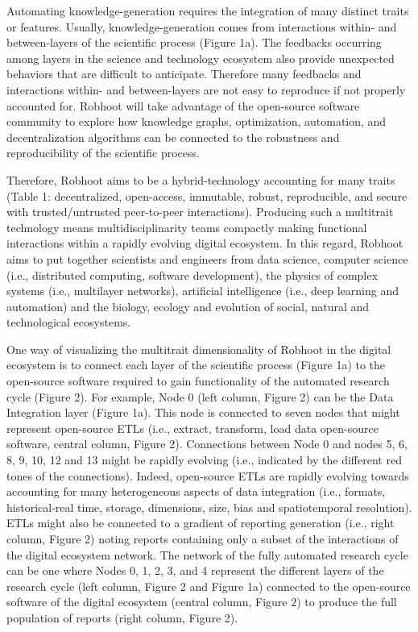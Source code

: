 \documentclass[10pt, a4paper, twocolumn]{article} %
\begin{document}
{  Automating knowledge-generation requires the integration of many
  distinct traits or features. Usually, knowledge-generation comes
  from interactions within- and between-layers of the scientific
  process (Figure 1a). The feedbacks occurring among layers in the
  science and technology ecosystem also provide unexpected behaviors
  that are difficult to anticipate. Therefore many feedbacks and
  interactions within- and between-layers are not easy to reproduce if
  not properly accounted for. Robhoot will take advantage of the
  open-source software community to explore how knowledge graphs,
  optimization, automation, and decentralization algorithms can be
  connected to the robustness and reproducibility of the scientific
  process.

  Therefore, Robhoot aims to be a hybrid-technology accounting for
  many traits (Table 1: decentralized, open-access, immutable, robust,
  reproducible, and secure with trusted/untrusted peer-to-peer
  interactions). Producing such a multitrait technology means
  multidisciplinarity teams compactly making functional interactions
  within a rapidly evolving digital ecosystem. In this regard, Robhoot
  aims to put together scientists and engineers from data science,
  computer science (i.e., distributed computing, software
  development), the physics of complex systems (i.e., multilayer
  networks), artificial intelligence (i.e., deep learning and
  automation) and the biology, ecology and evolution of social,
  natural and technological ecosystems.

  One way of visualizing the multitrait dimensionality of Robhoot in
  the digital ecosystem is to connect each layer of the scientific
  process (Figure 1a) to the open-source software required to gain
  functionality of the automated research cycle (Figure 2). For
  example, Node 0 (left column, Figure 2) can be the Data Integration
  layer (Figure 1a). This node is connected to seven nodes that might
  represent open-source ETLs (i.e., extract, transform, load data
  open-source software, central column, Figure 2). Connections between
  Node 0 and nodes 5, 6, 8, 9, 10, 12 and 13 might be rapidly evolving
  (i.e., indicated by the different red tones of the
  connections). Indeed, open-source ETLs are rapidly evolving towards
  accounting for many heterogeneous aspects of data integration (i.e.,
  formats, historical-real time, storage, dimensions, size, bias and
  spatiotemporal resolution). ETLs might also be connected to a
  gradient of reporting generation (i.e., right column, Figure 2)
  noting reports containing only a subset of the interactions of the
  digital ecosystem network. The network of the fully automated
  research cycle can be one where Nodes 0, 1, 2, 3, and 4 represent
  the different layers of the research cycle (left column, Figure 2
  and Figure 1a) connected to the open-source software of the digital
  ecosystem (central column, Figure 2) to produce the full population
  of reports (right column, Figure 2).


}
\end{document}
